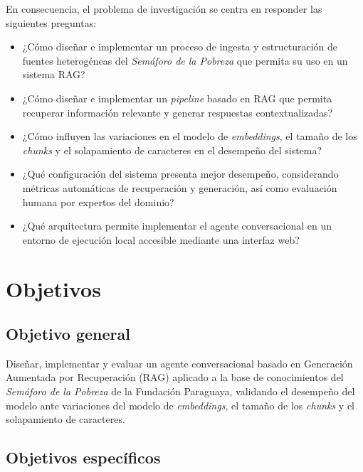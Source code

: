 \documentclass{article}
\begin{document}
En consecuencia, el problema de investigación se centra en responder las siguientes preguntas:

\begin{itemize}

\item ¿Cómo diseñar e implementar un proceso de ingesta y estructuración de fuentes heterogéneas del \textit{Semáforo de la Pobreza} que permita su uso en un sistema RAG?

\item ¿Cómo diseñar e implementar un \textit{pipeline} basado en RAG que permita recuperar información relevante y generar respuestas contextualizadas?

\item ¿Cómo influyen las variaciones en el modelo de \textit{embeddings}, el tamaño de los \textit{chunks} y el solapamiento de caracteres en el desempeño del sistema?

\item ¿Qué configuración del sistema presenta mejor desempeño, considerando métricas automáticas de recuperación y generación, así como evaluación humana por expertos del dominio?

\item ¿Qué arquitectura permite implementar el agente conversacional en un entorno de ejecución local accesible mediante una interfaz web?

\end{itemize}

\section{Objetivos}\label{sec:objetivos}

\subsection{Objetivo general}
Diseñar, implementar y evaluar un agente conversacional basado en Generación Aumentada por Recuperación (RAG) aplicado a la base de conocimientos del \textit{Semáforo de la Pobreza} de la Fundación Paraguaya, validando el desempeño del modelo ante variaciones del modelo de \textit{embeddings}, el tamaño de los \textit{chunks} y el solapamiento de caracteres.

\subsection{Objetivos específicos}
\end{document}
